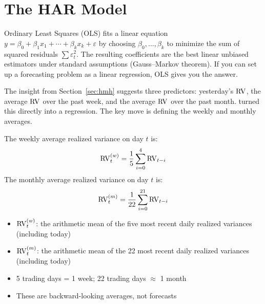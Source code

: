 \section{The HAR Model}
\label{sec:har-model}

\begin{prereq}
Ordinary Least Squares (OLS) fits a linear equation $y = \beta_0 + \beta_1 x_1 + \cdots + \beta_k x_k + \varepsilon$ by choosing $\beta_0, \ldots, \beta_k$ to minimize the sum of squared residuals $\sum \varepsilon^2_t$.
The resulting coefficients are the best linear unbiased estimators under standard assumptions (Gauss--Markov theorem).
If you can set up a forecasting problem as a linear regression, OLS gives you the answer.
\end{prereq}

The insight from Section~\ref{sec:hmh} suggests three predictors: yesterday's $\operatorname{RV}$, the average $\operatorname{RV}$ over the past week, and the average $\operatorname{RV}$ over the past month.
\citet{Corsi2009} turned this directly into a regression.
The key move is defining the weekly and monthly averages.

\begin{definition}
\label{def:rv-averages}
The weekly average realized variance on day $t$ is:
\begin{equation}
  \operatorname{RV}^{(w)}_{t} = \frac{1}{5}\sum_{i=0}^{4}\operatorname{RV}_{t-i}
  \label{eq:rv-weekly}
\end{equation}
The monthly average realized variance on day $t$ is:
\begin{equation}
  \operatorname{RV}^{(m)}_{t} = \frac{1}{22}\sum_{i=0}^{21}\operatorname{RV}_{t-i}
  \label{eq:rv-monthly}
\end{equation}
\begin{itemize}[nosep]
  \item $\operatorname{RV}^{(w)}_{t}$: the arithmetic mean of the five most recent daily realized variances (including today)
  \item $\operatorname{RV}^{(m)}_{t}$: the arithmetic mean of the 22 most recent daily realized variances (including today)
  \item 5 trading days = 1 week; 22 trading days $\approx$ 1 month
  \item These are backward-looking averages, not forecasts
\end{itemize}
\end{definition}

